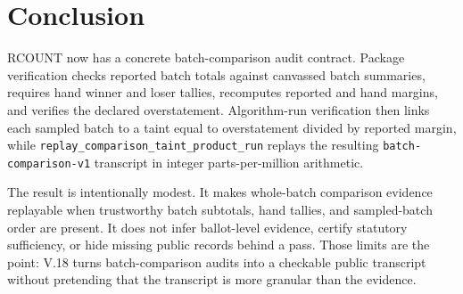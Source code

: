 \section{Conclusion}

RCOUNT now has a concrete batch-comparison audit contract. Package verification
checks reported batch totals against canvassed batch summaries, requires hand
winner and loser tallies, recomputes reported and hand margins, and verifies the
declared overstatement. Algorithm-run verification then links each sampled batch
to a taint equal to overstatement divided by reported margin, while
\texttt{replay\_comparison\_taint\_product\_run} replays the resulting
\texttt{batch-comparison-v1} transcript in integer parts-per-million arithmetic.

The result is intentionally modest. It makes whole-batch comparison evidence
replayable when trustworthy batch subtotals, hand tallies, and sampled-batch
order are present. It does not infer ballot-level evidence, certify statutory
sufficiency, or hide missing public records behind a pass. Those limits are the
point: V.18 turns batch-comparison audits into a checkable public transcript
without pretending that the transcript is more granular than the evidence.
